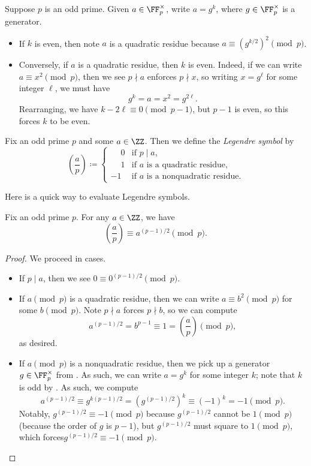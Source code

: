 \documentclass[../notes.tex]{subfiles}
\begin{document}
\begin{remark} \label{rem:qr-means-even}
	Suppose $p$ is an odd prime. Given $a\in\FF_p^\times$, write $a=g^k$, where $g\in\FF_p^\times$ is a generator.
	\begin{itemize}
		\item If $k$ is even, then note $a$ is a quadratic residue because $a\equiv\left(g^{k/2}\right)^2\pmod p$.
		\item Conversely, if $a$ is a quadratic residue, then $k$ is even. Indeed, if we can write $a\equiv x^2\pmod p$, then we see $p\nmid a$ enforces $p\nmid x$, so writing $x=g^\ell$ for some integer $\ell$, we must have
		\[g^k=a=x^2=g^{2\ell}.\]
		Rearranging, we have $k-2\ell\equiv0\pmod{p-1}$, but $p-1$ is even, so this forces $k$ to be even.
	\end{itemize}
\end{remark}
\begin{definition}
	Fix an odd prime $p$ and some $a\in\ZZ$. Then we define the \textit{Legendre symbol} by
	\[\left(\frac ap\right)\coloneqq\begin{cases}
		\phantom+0 & \text{if }p\mid a, \\
		\phantom+1 & \text{if }a\text{ is a quadratic residue}, \\
		-1 & \text{if }a\text{ is a nonquadratic residue}.
	\end{cases}\]
\end{definition}
Here is a quick way to evaluate Legendre symbols.
\begin{proposition} \label{prop:euler-criterion}
	Fix an odd prime $p$. For any $a\in\ZZ$, we have
	\[\left(\frac ap\right)\equiv a^{(p-1)/2}\pmod p.\]
\end{proposition}
\begin{proof}
	We proceed in cases.
	\begin{itemize}
		\item If $p\mid a$, then we see $0\equiv 0^{(p-1)/2}\pmod p$.
		\item If $a\pmod p$ is a quadratic residue, then we can write $a\equiv b^2\pmod p$ for some $b\pmod p$. Note $p\nmid a$ forces $p\nmid b$, so we can compute
		\[a^{(p-1)/2}=b^{p-1}\equiv1=\left(\frac ap\right)\pmod p,\]
		as desired.
		\item If $a\pmod p$ is a nonquadratic residue, then we pick up a generator $g\in\FF_p^\times$ from . As such, we can write $a=g^k$ for some integer $k$; note that $k$ is odd by . As such, we compute
		\[a^{(p-1)/2}\equiv g^{k(p-1)/2}=\left(g^{(p-1)/2}\right)^k\equiv(-1)^k=-1\pmod p.\]
		Notably, $g^{(p-1)/2}\equiv-1\pmod p$ because $g^{(p-1)/2}$ cannot be $1\pmod p$ (because the order of $g$ is $p-1$), but $g^{(p-1)/2}$ must square to $1\pmod p$, which forces$g^{(p-1)/2}\equiv-1\pmod p$.
		\qedhere
	\end{itemize}
\end{proof}
\end{document}
